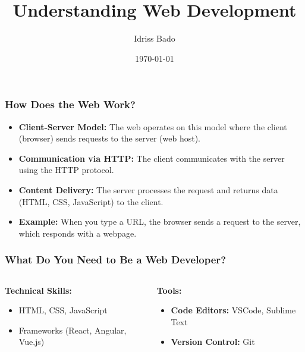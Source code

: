 \documentclass{beamer}
\title{Understanding Web Development}
\author{Idriss Bado}
\date{\today}
\begin{document}
\begin{frame}
  \titlepage
  \vspace{0.5cm}
  \centering
  
\end{frame}

\begin{frame}
  \frametitle{How Does the Web Work?}
  \begin{itemize}
    \item \textbf{Client-Server Model:} The web operates on this model where the client (browser) sends requests to the server (web host).
    \item \textbf{Communication via HTTP:} The client communicates with the server using the HTTP protocol.
    \item \textbf{Content Delivery:} The server processes the request and returns data (HTML, CSS, JavaScript) to the client.
    \item \textbf{Example:} When you type a URL, the browser sends a request to the server, which responds with a webpage.
  \end{itemize}
  \vspace{0.5cm}

\end{frame}

\begin{frame}
  \frametitle{What Do You Need to Be a Web Developer?}
  \begin{columns}
    \begin{column}{0.5\textwidth}
      \textbf{Technical Skills:}
      \begin{itemize}
        \item HTML, CSS, JavaScript
        \item Frameworks (React, Angular, Vue.js)
      \end{itemize}
    \end{column}
    \begin{column}{0.5\textwidth}
      \textbf{Tools:}
      \begin{itemize}
        \item {} \textbf{Code Editors:} VSCode, Sublime Text
        \item {} \textbf{Version Control:} Git
      \end{itemize}
    \end{column}
  \end{columns}
  \vspace{0.5cm}
  
\end{frame}
\end{document}

